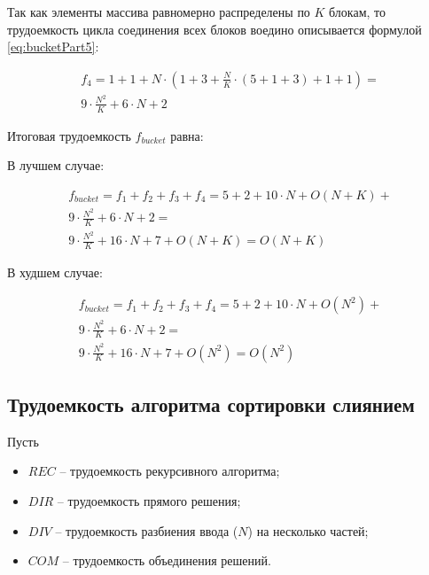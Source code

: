 Так как элементы массива равномерно распределены по $K$ блокам, то трудоемкость цикла соединения всех блоков воедино описывается формулой \ref{eq:bucketPart5}:

\begin{equation}
	\label{eq:bucketPart5}
	\begin{gathered}
		f_4 = 1 + 1 + N \cdot (1 + 3 + \frac{N}{K} \cdot (5 + 1 + 3) + 1 + 1) = \\
		9 \cdot \frac{N^2}{K} + 6 \cdot N + 2
	\end{gathered}
\end{equation}

Итоговая трудоемкость $f_{bucket}$ равна:

В лучшем случае:

\begin{equation}
	\label{eq:bucketFull1}
	\begin{gathered}
		f_{bucket} = f_1 + f_2 + f_3 + f_4 = 5 + 2 + 10 \cdot N + O(N + K) + \\
		9 \cdot \frac{N^2}{K} + 6 \cdot N + 2 =  \\
		9 \cdot \frac{N^2}{K} + 16 \cdot N + 7 + O(N + K) = O(N + K)
	\end{gathered}
\end{equation}

В худшем случае:

\begin{equation}
	\label{eq:bucketFull2}
	\begin{gathered}
		f_{bucket} = f_1 + f_2 + f_3 + f_4 = 5 + 2 + 10 \cdot N + O(N^2) + \\
		9 \cdot \frac{N^2}{K} + 6 \cdot N + 2 =  \\
		9 \cdot \frac{N^2}{K} + 16 \cdot N + 7 + O(N^2) = O(N^2)
	\end{gathered}
\end{equation}

\clearpage

\subsection{Трудоемкость алгоритма сортировки слиянием}

Пусть 

\begin{itemize}[label=---]
	\item $REC$ -- трудоемкость рекурсивного алгоритма;
	\item $DIR$ -- трудоемкость прямого решения;
	\item $DIV$ -- трудоемкость разбиения ввода ($N$) на несколько частей;
	\item $COM$ -- трудоемкость объединения решений.
\end{itemize}

